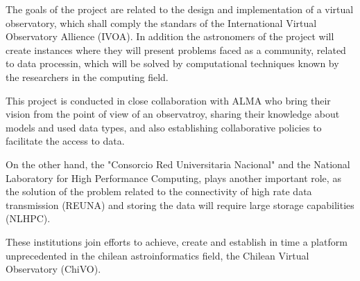 The goals of the project are related to the design and implementation of a
virtual observatory, which shall comply the standars of the International
Virtual Observatory Allience (IVOA). In addition the astronomers of the
project will create instances where they will present problems faced as a community,
related to data processin, which will be solved by computational techniques
known by the researchers in the computing field.

This project is conducted in close collaboration with ALMA who bring their
vision from the point of view of an observatroy, sharing their knowledge about models and
used data types, and also establishing collaborative policies to
facilitate the access to data.

On the other hand, the "Consorcio Red Universitaria Nacional" and the National
Laboratory for High Performance Computing, plays another important role, as the solution
of the problem related to the connectivity of high rate data transmission
(REUNA) and storing the data will require large storage capabilities (NLHPC).

These institutions join efforts to achieve, create and establish in
time a platform unprecedented in the chilean astroinformatics field, the Chilean
Virtual Observatory (ChiVO).
